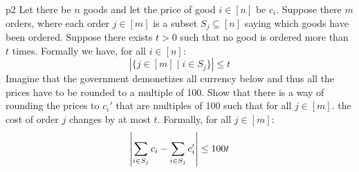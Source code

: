 \documentclass[a4paper, 11pt]{article}
\begin{document}
\newpage
\begin{problem}{%
	}{p2%
	}
Let there be $n$ goods and let the price of good $i\in[n]$ be $c_i$. Suppose there $m$ orders, where each order $j\in[m]$ is a subset $S_j\subseteq [n]$ saying which goods have been ordered. Suppose there exists $t>0$ such that no good is ordered more than $t$ times. Formally we have, for all $i\in [n]$: $$|\{j\in[m]\mid i\in S_j\}|\leq t$$
	Imagine that the government demonetizes all currency below  and thus all the prices have to be rounded to a multiple of 100. Show that there is a way of rounding the prices to $c_i'$ that are multiples of 100 such that for all $j\in[m]$. the cost of order $j$ changes by at most $t$. Formally, for all $j\in[m]$: $$\left|\sum_{i\in S_j}c_i-\sum_{i\in S_j}c_i'\right|\leq 100t$$
\end{problem}
\solve{	
}
\end{document}
